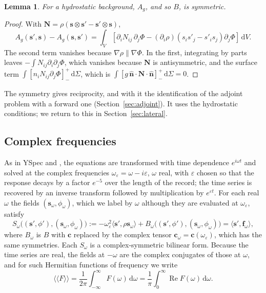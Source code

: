 \documentclass[11pt,a4paper]{article}
\newcommand{\bs}{\mathbf{s}}
\newcommand{\bc}{\mathbf{c}}
\newcommand{\bn}{\hat{\mathbf{n}}}
\newcommand{\jump}[1]{\left[#1\right]^+_-}
\renewcommand{\Re}{\operatorname{Re}}
\newcommand{\dd}{\,\mathrm{d}}
\newtheorem{lemma}{Lemma}
\theoremstyle{remark}
\begin{document}
\begin{lemma}\label{lem:symmetry}
For a hydrostatic background, $A_g$, and so $B$, is symmetric.
\end{lemma}
\begin{proof}
With $\mathbf{N} = \rho(\bs\otimes\bs'-\bs'\otimes\bs)$,
\[
  A_g(\bs',\bs)-A_g(\bs,\bs') = \int_V\left[\partial_i N_{ij}\,
  \partial_j\Phi - (\partial_i\rho)(s_is'_j-s'_is_j)\partial_j\Phi\right]
  \dd V.
\]
The second term vanishes because $\nabla\rho\parallel\nabla\Phi$. In the
first, integrating by parts leaves $-\int N_{ij}\partial_i\partial_j\Phi$,
which vanishes because $\mathbf{N}$ is antisymmetric, and the surface term
$\int\jump{n_iN_{ij}\partial_j\Phi}\dd\Sigma$, which is
$\int\jump{g\,\bn\cdot\mathbf{N}\cdot\bn}\dd\Sigma=0$.
\end{proof}
The symmetry gives reciprocity, and with it the identification of the
adjoint problem with a forward one (Section~\ref{sec:adjoint}). It uses
the hydrostatic conditions; we return to this in
Section~\ref{sec:lateral}.

\subsection{Complex frequencies}

As in YSpec and \citet{Adourian2024}, the equations are transformed with
time dependence $e^{i\omega t}$ and solved at the complex frequencies
$\omega_\varepsilon = \omega - i\varepsilon$, $\omega$ real, with
$\varepsilon$ chosen so that the response decays by a factor $e^{-5}$ over
the length of the record; the time series is recovered by an inverse
transform followed by multiplication by $e^{\varepsilon t}$. For each real
$\omega$ the fields $(\bs_\omega,\phi_\omega)$, which we label by $\omega$
although they are evaluated at $\omega_\varepsilon$, satisfy
\begin{equation}
  S_\omega\big((\bs',\phi'),(\bs_\omega,\phi_\omega)\big) :=
  -\omega_\varepsilon^2\langle\bs',\rho\bs_\omega\rangle
  + B_\omega\big((\bs',\phi'),(\bs_\omega,\phi_\omega)\big) =
  \langle\bs',\mathbf{f}_\omega\rangle, \label{eq:S}
\end{equation}
where $B_\omega$ is $B$ with $\bc$ replaced by the complex tensor
$\bc_\omega=\bc(\omega_\varepsilon)$, which has the same symmetries. Each
$S_\omega$ is a complex-symmetric bilinear form. Because the time series are
real, the fields at $-\omega$ are the complex conjugates of those at
$\omega$, and for such Hermitian functions of frequency we write
\begin{equation}
  \langle\!\langle F\rangle\!\rangle = \frac{1}{2\pi}\int_{-\infty}^\infty
  F(\omega)\dd\omega = \frac{1}{\pi}\int_0^\infty\Re F(\omega)\dd\omega.
  \label{eq:fsum}
\end{equation}
\end{document}
